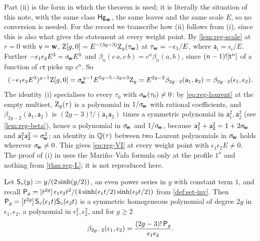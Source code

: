 Part (ii) is the form in which the theorem is used; it is literally the situation of this note, with the same class $\mathsf{Hg}_{\mathbf{w}}$, the same leaves and the same scale $E$, so no conversion is needed. For the record we transcribe how (ii) follows from (i), since this is also what gives the statement at every weight point. By \cref{lem:reg-scale} at $r=0$ with $\mathsf{v}=\mathbf{w}$, $\mathrm{Z}[g,0]=E^{-(3g-3)}\mathrm{Z}_g(\tau_{\mathbf{w}})$ at $\tau_{\mathbf{w}}=-\epsilon_1/E$, where $\mathsf{a}_i=\epsilon_i/E$. Further $-\epsilon_1\epsilon_2E^3=\sigma_{\!\mathbf{w}} E^5$ and $\beta_n(c\,a,c\,b)=c^{n}\beta_n(a,b)$, since $(n-1)![\mathsf{t}^n]$ of a function of $c\mathsf{t}$ picks up $c^n$. So
\[
(-\epsilon_1\epsilon_2E^3)^{g-1}\mathrm{Z}[g,0]=\sigma_{\!\mathbf{w}}^{\,g-1}E^{5g-5-3g+3}\mathrm{Z}_g=E^{2g-2}\beta_{2g-2}(\mathsf{a}_1,\mathsf{a}_2)=\beta_{2g-2}(\epsilon_1,\epsilon_2).
\]
The identity (i) specialises to every $\tau_0$ with $\sigma_{\!\mathbf{w}}(\tau_0)\neq 0$: by \eqref{eq:reg-laurent} at the empty multiset, $\mathrm{Z}_g(\tau)$ is a polynomial in $1/\sigma_{\!\mathbf{w}}$ with rational coefficients, and $\beta_{2g-2}(\mathsf{a}_1,\mathsf{a}_2)$ is $(2g-3)!/(\mathsf{a}_1\mathsf{a}_2)$ times a symmetric polynomial in $\mathsf{a}_1^2,\mathsf{a}_2^2$ (see \cref{lem:reg-beta}), hence a polynomial in $\sigma_{\!\mathbf{w}}$ and $1/\sigma_{\!\mathbf{w}}$, because $\mathsf{a}_1^2+\mathsf{a}_2^2=1+2\sigma_{\!\mathbf{w}}$ and $\mathsf{a}_1^2\mathsf{a}_2^2=\sigma_{\!\mathbf{w}}^2$; an identity in $\mathbb{Q}(\tau)$ between two Laurent polynomials in $\sigma_{\!\mathbf{w}}$ holds wherever $\sigma_{\!\mathbf{w}}\neq 0$. This gives \eqref{eq:reg-VI} at every weight point with $\epsilon_1\epsilon_2E\neq 0$. The proof of (i) in \cite{LP2} uses the Mari\~no--Vafa formula only at the profile $1^a$ and nothing from \cref{thm:reg-L}; it is not reproduced here.

\begin{lem}
\label{lem:reg-beta}
Let $\mathsf{S}_{\circ}(y)\coloneqq y/(2\sinh(y/2))$, an even power series in $y$ with constant term $1$, and recall $\mathsf{P}_{g}=[t^{2g}]\,\epsilon_1\epsilon_2t^2/(4\sinh(\epsilon_1t/2)\sinh(\epsilon_2t/2))$ from \cref{def:set-inv}. Then $\mathsf{P}_{g}=[t^{2g}]\,\mathsf{S}_{\circ}(\epsilon_1t)\mathsf{S}_{\circ}(\epsilon_2t)$ is a symmetric homogeneous polynomial of degree $2g$ in $\epsilon_1,\epsilon_2$, a polynomial in $\epsilon_1^2,\epsilon_2^2$, and for $g\geq 2$
\begin{equation}
\label{eq:reg-beta}
\beta_{2g-2}(\epsilon_1,\epsilon_2)=\frac{(2g-3)!\,\mathsf{P}_{g}}{\epsilon_1\epsilon_2}.
\end{equation}
\end{lem}

